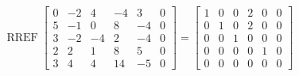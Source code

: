 \begin{exerciseAnswer} 


\[\operatorname{RREF} \left[\begin{array}{ccccc|c}
0 & -2 & 4 & -4 & 3 & 0 \\
5 & -1 & 0 & 8 & -4 & 0 \\
3 & -2 & -4 & 2 & -4 & 0 \\
2 & 2 & 1 & 8 & 5 & 0 \\
3 & 4 & 4 & 14 & -5 & 0
\end{array}\right] = \left[\begin{array}{ccccc|c}
1 & 0 & 0 & 2 & 0 & 0 \\
0 & 1 & 0 & 2 & 0 & 0 \\
0 & 0 & 1 & 0 & 0 & 0 \\
0 & 0 & 0 & 0 & 1 & 0 \\
0 & 0 & 0 & 0 & 0 & 0
\end{array}\right] \]



\end{exerciseAnswer}
